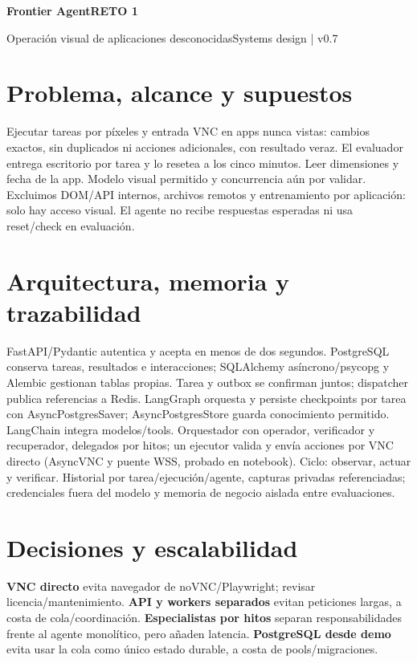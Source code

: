 \documentclass[9pt,a4paper]{extarticle}
\begin{document}
{\color{navy}\bfseries\fontsize{20}{22}\selectfont Frontier Agent}\hfill{\color{teal}\bfseries RETO 1}

{\color{navy}\fontsize{10}{12}\selectfont Operación visual de aplicaciones desconocidas}\hfill{\small Systems design | v0.7}

\vspace{5pt}
\section{Problema, alcance y supuestos}
Ejecutar tareas por píxeles y entrada VNC en apps nunca vistas: cambios exactos, sin duplicados ni acciones adicionales, con resultado veraz. El evaluador entrega escritorio por tarea y lo resetea a los cinco minutos. Leer dimensiones y fecha de la app. Modelo visual permitido y concurrencia aún por validar. Excluimos DOM/API internos, archivos remotos y entrenamiento por aplicación: solo hay acceso visual. El agente no recibe respuestas esperadas ni usa reset/check en evaluación.

\section{Arquitectura, memoria y trazabilidad}
FastAPI/Pydantic autentica y acepta en menos de dos segundos. PostgreSQL conserva tareas, resultados e interacciones; SQLAlchemy asíncrono/psycopg y Alembic gestionan tablas propias. Tarea y outbox se confirman juntos; dispatcher publica referencias a Redis. LangGraph orquesta y persiste checkpoints por tarea con AsyncPostgresSaver; AsyncPostgresStore guarda conocimiento permitido. LangChain integra modelos/tools. Orquestador con operador, verificador y recuperador, delegados por hitos; un ejecutor valida y envía acciones por VNC directo (AsyncVNC y puente WSS, probado en notebook). Ciclo: observar, actuar y verificar. Historial por tarea/ejecución/agente, capturas privadas referenciadas; credenciales fuera del modelo y memoria de negocio aislada entre evaluaciones.

\section{Decisiones y escalabilidad}
\textbf{VNC directo} evita navegador de noVNC/Playwright; revisar licencia/mantenimiento. \textbf{API y workers separados} evitan peticiones largas, a costa de cola/coordinación. \textbf{Especialistas por hitos} separan responsabilidades frente al agente monolítico, pero añaden latencia. \textbf{PostgreSQL desde demo} evita usar la cola como único estado durable, a costa de pools/migraciones.
\end{document}
